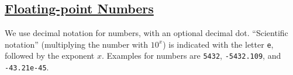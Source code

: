 \subsection*{\href{https://sourceacademy.org/sicpjs/1.1.1\#p3}{Floating-point Numbers}}

We use decimal notation for numbers, with an optional decimal dot. ``Scientific notation''
(multiplying the number with $10^x$) is indicated with the letter \texttt{e}, followed
by the exponent $x$.
Examples for numbers are \texttt{5432}, \texttt{-5432.109}, and \texttt{-43.21e-45}.

